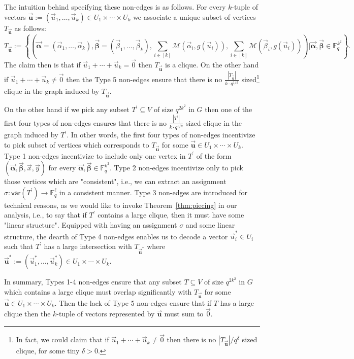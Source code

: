 \documentclass[10pt,a4paper]{article}
\newcommand{\F}{\mathbb{F}}
\newcommand{\alphab}{\vec{\bm{\alpha}}}
\newcommand{\betab}{\vec{\bm{\beta}}}
\newcommand{\var}{\mathsf{var}}
\newcommand{\M}{\mathcal{M}}
\begin{document}
{The intuition behind specifying these non-edges is as follows. For every $k$-tuple of vectors $\vec{\bm{u}}:=(\vec{u}_1,\ldots ,\vec{u}_k)\in U_1\times \cdots \times U_k$ we associate a unique subset of vertices  $T_{\vec{\bm{u}}}$ as follows:
$$
T_{\vec{\bm{u}}}:=\left\{\left(\alphab=(\vec{\alpha}_1,\ldots ,\vec{\alpha}_{k}),\betab=(\vec{\beta}_1,\ldots ,\vec{\beta}_{k}),\sum_{i\in[k]}\M(\vec{\alpha}_i,g(\vec{u}_i)),\sum_{i\in[k]}\M(\vec{\beta}_i,g(\vec{u}_i))\right)\bigg| \alphab,\betab\in \F_q^{k^2}\right\}.
$$
The claim then is that if $\vec{u}_1+\cdots +\vec{u}_k=\vec{0}$ then $T_{\vec{\bm{u}}}$ is a clique. On the other hand if $\vec{u}_1+\cdots +\vec{u}_k\neq\vec{0}$ then the Type 5 non-edges ensure that there is no $\frac{|T_{\vec{\bm{u}}}|}{k\cdot q^{1/k}}$ sized\footnote{\label{footnote}In fact, we could claim that if $\vec{u}_1+\cdots +\vec{u}_k\neq\vec{0}$ then there is no $|T_{\vec{\bm{u}}}|/q^{\delta}$ sized clique, for some tiny $\delta>0$. } clique in the graph induced by $T_{\vec{\bm{u}}}$. 

On the other hand if we pick any subset $T^\prime\subseteq V$ of size $q^{2k^2}$ in $G$ then one of the first four types of non-edges ensures that there is no $\frac{|T^\prime|}{k\cdot q^{1/k}}$ sized clique in the graph induced by $T^\prime$. In other words, the first four types of non-edges incentivize to pick subset of vertices which corresponds to $T_{\vec{\bm{u}}}$ for some $\vec{\bm{u}}\in U_1\times \cdots \times U_k$. 
Type 1 non-edges incentivize to  include only one vertex in $T^\prime$ of the form $(\alphab,\betab,\vec{x},\vec{y})$ for every $\alphab,\betab\in \F_q^{k^2}$. Type 2 non-edges incentivize only to pick those vertices which are "consistent", i.e., we can extract an assignment $\sigma:\var(T^\prime)\to\F_q^\ell$ in a consistent manner.  Type 3 non-edges are introduced for technical reasons, as we would like to invoke Theorem~\ref{thm:piecing} in our analysis, i.e., to say that if $T^\prime$ contains a large clique, then it must have some "linear structure". Equipped with having an assignment $\sigma$ and some linear structure, the dearth of Type 4 non-edges enables us to decode a vector $\vec{u}_i^\ast\in U_i$ such that $T^\prime$ has a large intersection with $T_{\vec{\bm{u}}^\ast}$  where
$\vec{\bm{u}}^\ast:=(\vec{u}_1^\ast,\ldots ,\vec{u}_k^\ast)\in U_1\times \cdots \times U_k$. }

In summary, Types 1-4 non-edges ensure that any subset $T\subseteq V$ of size $q^{2k^2}$ in $G$ which contains a large clique must overlap significantly with  $T_{\vec{\bm{u}}}$ for some $\vec{\bm{u}}\in U_1\times \cdots \times U_k$. Then the lack of Type 5 non-edges ensure that if $T$ has a large clique then the $k$-tuple of vectors represented by $\vec{\bm{u}}$ must sum to $\vec{0}$.
\end{document}
